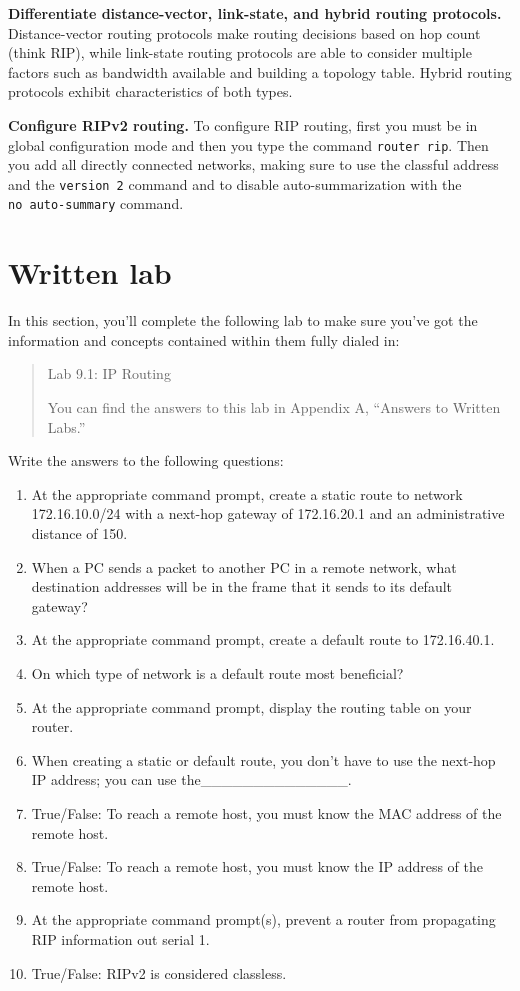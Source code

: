 \textbf{Differentiate distance-vector, link-state, and hybrid routing
protocols.} Distance-vector routing protocols make routing decisions
based on hop count (think RIP), while link-state routing protocols are
able to consider multiple factors such as bandwidth available and
building a topology table. Hybrid routing protocols exhibit
characteristics of both types.

\textbf{Configure RIPv2 routing.} To configure RIP routing, first you
must be in global configuration mode and then you type the command
\texttt{router\ rip}. Then you add all directly connected networks,
making sure to use the classful address and the \texttt{version\ 2}
command and to disable auto-summarization with the
\texttt{no\ auto-summary} command.



\section{Written lab}

In this section, you'll complete the following lab to make sure you've
got the information and concepts contained within them fully dialed in:

\begin{quote}
Lab 9.1: IP Routing

You can find the answers to this lab in Appendix A, ``Answers to Written
Labs.''
\end{quote}

Write the answers to the following questions:

\begin{enumerate}
\tightlist
\item
  At the appropriate command prompt, create a static route to network
  172.16.10.0/24 with a next-hop gateway of 172.16.20.1 and an
  administrative distance of 150.
\item
  When a PC sends a packet to another PC in a remote network, what
  destination addresses will be in the frame that it sends to its
  default gateway?
\item
  At the appropriate command prompt, create a default route to
  172.16.40.1.
\item
  On which type of network is a default route most beneficial?
\item
  At the appropriate command prompt, display the routing table on your
  router.
\item
  When creating a static or default route, you don't have to use the
  next-hop IP address; you can use the\_\_\_\_\_\_\_\_\_\_\_\_\_\_.
\item
  True/False: To reach a remote host, you must know the MAC address of
  the remote host.
\item
  \protect\hypertarget{c09.xhtmlux5cux23Page_401}{}{}True/False: To
  reach a remote host, you must know the IP address of the remote host.
\item
  At the appropriate command prompt(s), prevent a router from
  propagating RIP information out serial 1.
\item
  True/False: RIPv2 is considered classless.
\end{enumerate}




